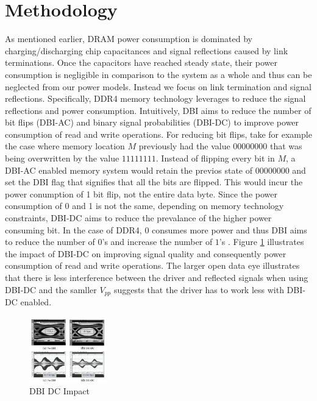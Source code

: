 \section{Methodology}
\label{sec-methodology}


As mentioned earlier, DRAM power consumption is dominated by
charging/discharging chip capacitances and signal reflections caused by link
terminations. Once the capacitors have reached steady state, their power
consumption is negligible in comparison to the system as a whole and thus can
be neglected from our power models. Instead we focus on link termination and
signal reflections. Specifically, DDR4 memory technology leverages  to
reduce the signal reflections and power consumption. Intuitively, DBI aims to
reduce the number of bit flips (DBI-AC) and binary signal probabilities
(DBI-DC) to improve power consumption of read and write operations. For
reducing bit flips, take for example the case where memory location $M$
previously had the value $00000000$ that was being overwritten by the value
$11111111$. Instead of flipping every bit in $M$, a DBI-AC enabled memory system
would retain the previos state of $00000000$ and set the DBI flag that
signifies that all the bits are flipped.  This would incur the power conumption
of 1 bit flip, not the entire data byte.  Since the power consumption of 0 and
1 is not the same, depending on memory technology constraints, DBI-DC aims to
reduce the prevalance of the higher power consuming bit. In the case of DDR4,
$0$ consumes more power and thus DBI aims to reduce the number of $0$'s and
increase the number of $1$'s . Figure \ref{fig:dbi-dc}
illustrates the impact of DBI-DC on improving signal quality and consequently
power consumption of read and write operations. The larger open data eye
illustrates that there is less interference between the driver and reflected
signals when using DBI-DC and the samller $V_{pp}$ suggests that the driver has
to work less with DBI-DC enabled.

\begin{figure}[!htb]
  \centering
  \includegraphics[width=0.3\textwidth]{figs/dbi-dc}
  \caption{DBI DC Impact \cite{hollis}}
  \label{fig:dbi-dc}
\end{figure}

